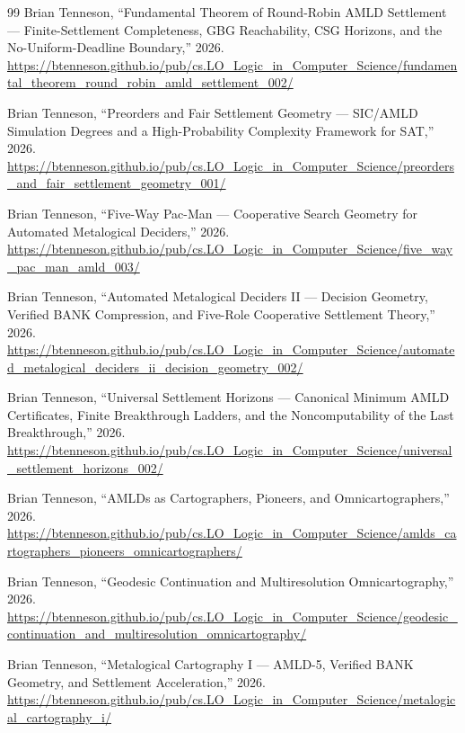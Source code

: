 \documentclass[11pt]{article}
\theoremstyle{definition}
\begin{document}
\begin{thebibliography}{99}
Brian Tenneson,
``Fundamental Theorem of Round-Robin AMLD Settlement --- Finite-Settlement Completeness, GBG Reachability, CSG Horizons, and the No-Uniform-Deadline Boundary,'' 2026.\\
\url{https://btenneson.github.io/pub/cs.LO_Logic_in_Computer_Science/fundamental_theorem_round_robin_amld_settlement_002/}

Brian Tenneson,
``Preorders and Fair Settlement Geometry --- SIC/AMLD Simulation Degrees and a High-Probability Complexity Framework for SAT,'' 2026.\\
\url{https://btenneson.github.io/pub/cs.LO_Logic_in_Computer_Science/preorders_and_fair_settlement_geometry_001/}

Brian Tenneson,
``Five-Way Pac-Man --- Cooperative Search Geometry for Automated Metalogical Deciders,'' 2026.\\
\url{https://btenneson.github.io/pub/cs.LO_Logic_in_Computer_Science/five_way_pac_man_amld_003/}

Brian Tenneson,
``Automated Metalogical Deciders II --- Decision Geometry, Verified BANK Compression, and Five-Role Cooperative Settlement Theory,'' 2026.\\
\url{https://btenneson.github.io/pub/cs.LO_Logic_in_Computer_Science/automated_metalogical_deciders_ii_decision_geometry_002/}

Brian Tenneson,
``Universal Settlement Horizons --- Canonical Minimum AMLD Certificates, Finite Breakthrough Ladders, and the Noncomputability of the Last Breakthrough,'' 2026.\\
\url{https://btenneson.github.io/pub/cs.LO_Logic_in_Computer_Science/universal_settlement_horizons_002/}

Brian Tenneson,
``AMLDs as Cartographers, Pioneers, and Omnicartographers,'' 2026.\\
\url{https://btenneson.github.io/pub/cs.LO_Logic_in_Computer_Science/amlds_cartographers_pioneers_omnicartographers/}

Brian Tenneson,
``Geodesic Continuation and Multiresolution Omnicartography,'' 2026.\\
\url{https://btenneson.github.io/pub/cs.LO_Logic_in_Computer_Science/geodesic_continuation_and_multiresolution_omnicartography/}

Brian Tenneson,
``Metalogical Cartography I --- AMLD-5, Verified BANK Geometry, and Settlement Acceleration,'' 2026.\\
\url{https://btenneson.github.io/pub/cs.LO_Logic_in_Computer_Science/metalogical_cartography_i/}


\end{thebibliography}
\end{document}
